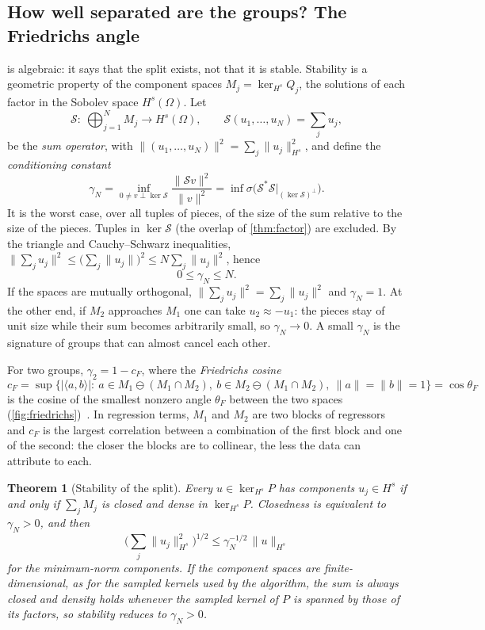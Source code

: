 \documentclass[11pt]{article}
\theoremstyle{plain}
\newtheorem{theorem}{Theorem}[section]
\theoremstyle{definition}
\theoremstyle{remark}
\newcommand{\sumop}{\mathcal{S}}            %
\newcommand{\cF}{c_{F}}                     %
\newcommand{\thetaF}{\theta_{F}}            %
\newcommand{\gN}{\gamma_{N}}                %
\newcommand{\Hs}{H^{s}}                     %
\newcommand{\abs}[1]{\lvert#1\rvert}
\newcommand{\norm}[1]{\lVert#1\rVert}
\newcommand{\ip}[2]{\langle#1,#2\rangle}
\begin{document}
\subsection{How well separated are the groups? The Friedrichs angle}\label{sec:cond}
 is algebraic: it says that the split exists, not that it is stable. Stability is a
geometric property of the component spaces $M_j=\ker_{\Hs}Q_j$, the solutions of each factor in the
Sobolev space $\Hs(\Omega)$. Let
\[
  \sumop:\ \textstyle\bigoplus_{j=1}^N M_j\to\Hs(\Omega),\qquad \sumop(u_1,\dots,u_N)=\sum_ju_j,
\]
be the \emph{sum operator}, with $\norm{(u_1,\dots,u_N)}^2=\sum_j\norm{u_j}_{\Hs}^2$, and define the
\emph{conditioning constant}
\begin{equation}\label{eq:gammaN}
  \gN=\inf_{0\ne v\perp\ker\sumop}\frac{\norm{\sumop v}^2}{\norm{v}^2}
  =\inf\sigma\big(\sumop^*\sumop\big|_{(\ker\sumop)^\perp}\big).
\end{equation}
It is the worst case, over all tuples of pieces, of the size of the sum relative to the size of the
pieces. Tuples in $\ker\sumop$ (the overlap of \cref{thm:factor}) are excluded. By the triangle and Cauchy--Schwarz inequalities,
$\norm{\sum_ju_j}^2\le\big(\sum_j\norm{u_j}\big)^2\le N\sum_j\norm{u_j}^2$, hence
\[
  0\le\gN\le N .
\]
If the spaces are mutually orthogonal, $\norm{\sum_ju_j}^2=\sum_j\norm{u_j}^2$ and $\gN=1$. At the other end, if $M_2$
approaches $M_1$ one can take $u_2\approx-u_1$: the pieces stay of unit size while their sum becomes arbitrarily
small, so $\gN\to0$. A small $\gN$ is the signature of groups that can almost cancel each other.

For two groups, $\gamma_2=1-\cF$, where the \emph{Friedrichs cosine}
\[
  \cF=\sup\big\{\abs{\ip ab}:\ a\in M_1\ominus(M_1\cap M_2),\ b\in M_2\ominus(M_1\cap M_2),\
  \norm a=\norm b=1\big\}=\cos\thetaF
\]
is the cosine of the smallest nonzero angle $\thetaF$ between the two spaces
(\cref{fig:friedrichs})~\cite{Deu01}. In regression terms, $M_1$ and $M_2$ are two blocks of regressors and $\cF$ is the
largest correlation between a combination of the first block and one of the second: the closer the blocks are to
collinear, the less the data can attribute to each.

\begin{theorem}[Stability of the split]\label{thm:hm}
Every $u\in\ker_{\Hs}P$ has components $u_j\in\Hs$ if and only if $\sum_jM_j$ is closed and dense in
$\ker_{\Hs}P$. Closedness is equivalent to $\gN>0$, and then
\begin{equation}\label{eq:stability}
  \Big(\sum_j\norm{u_j}_{\Hs}^2\Big)^{1/2}\le\gN^{-1/2}\,\norm{u}_{\Hs}
\end{equation}
for the minimum-norm components. If the component spaces are finite-dimensional, as for the sampled
kernels used by the algorithm, the sum is always closed and density holds whenever the sampled kernel of
$P$ is spanned by those of its factors, so stability reduces to $\gN>0$.
\end{theorem}
\end{document}
